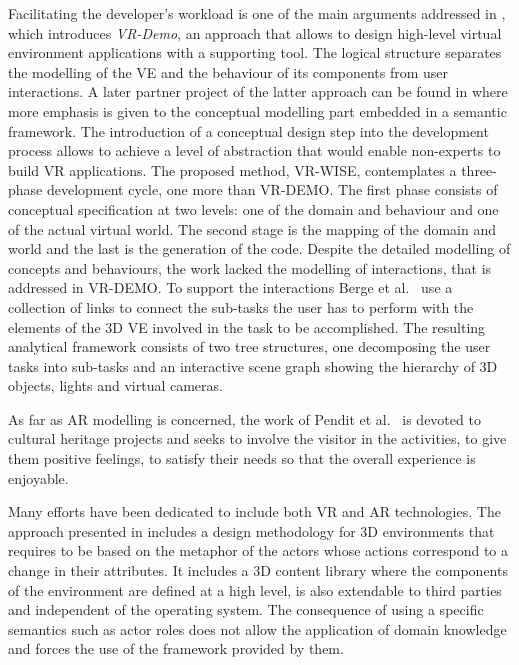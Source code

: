 Facilitating the developer's workload is one of the main arguments addressed in \cite{coninx_vr-demo_2006}, which introduces \textit{VR-Demo}, an approach that allows to design high-level virtual environment applications with a supporting tool. The logical structure separates the modelling of the VE and the behaviour of its components from user interactions. A later partner project of the latter approach can be found in \cite{de_troyer_conceptual_2007, bille_conceptual_2007} where more emphasis is given to the conceptual modelling part embedded in a semantic framework. The introduction of a conceptual design step into the development process allows to achieve a level of abstraction that would enable non-experts to build VR applications. The proposed method, VR-WISE, contemplates a three-phase development cycle, one more than VR-DEMO. The first phase consists of conceptual specification at two levels: one of the domain and behaviour and one of the actual virtual world. The second stage is the mapping of the domain and world and the last is the generation of the code. Despite the detailed modelling of concepts and behaviours, the work lacked the modelling of interactions, that is addressed in VR-DEMO. To support the interactions Berge et al.~\cite{berge_towards_2014} use a collection of links to connect the sub-tasks the user has to perform with the elements of the 3D VE involved in the task to be accomplished. The resulting analytical framework consists of two tree structures, one decomposing the user tasks into sub-tasks and an interactive scene graph showing the hierarchy of 3D objects, lights and virtual cameras. 

As far as AR modelling is concerned, the work of Pendit et al.~\cite{chandini_pendit_conceptual_2015} is devoted to cultural heritage projects and seeks to involve the visitor in the activities, to give them positive feelings, to satisfy their needs so that the overall experience is enjoyable. 

Many efforts have been dedicated to include both VR and AR technologies. The approach presented in \cite{geiger_structured_2001} includes a design methodology for 3D environments that requires to be based on the metaphor of the actors whose actions correspond to a change in their attributes. It includes a 3D content library where the components of the environment are defined at a high level, is also extendable to third parties and independent of the operating system. The consequence of using a specific semantics such as actor roles does not allow the application of domain knowledge and forces the use of the framework provided by them.


